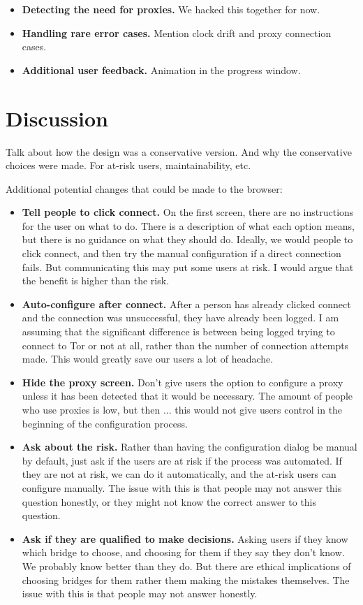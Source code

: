 \documentclass{template}
\begin{document}
\begin{itemize} \itemsep1pt \parskip0pt  
\item {\bfseries Detecting the need for proxies.} We hacked this together for now. 
\item {\bfseries Handling rare error cases.} Mention clock drift and proxy connection cases.
\item {\bfseries Additional user feedback.} Animation in the progress window. 
\end{itemize} 

\section{Discussion}
Talk about how the design was a conservative version. And why the conservative choices were made. For at-risk users, maintainability, etc.

Additional potential changes that could be made to the browser: 
\begin{itemize} \itemsep1pt \parskip0pt  
\item {\bfseries Tell people to click connect.} On the first screen, there are no instructions for the user on what to do. There is a description of what each option means, but there is no guidance on what they should do. Ideally, we would people to click connect, and then try the manual configuration if a direct connection fails. But communicating this may put some users at risk. I would argue that the benefit is higher than the risk. 
\item {\bfseries Auto-configure after connect.} After a person has already clicked connect and the connection was unsuccessful, they have already been logged. I am assuming that the significant difference is between being logged trying to connect to Tor or not at all, rather than the number of connection attempts made. This would greatly save our users a lot of headache. 
\item{\bfseries Hide the proxy screen.} Don't give users the option to configure a proxy unless it has been detected that it would be necessary. The amount of people who use proxies is low, but then ... this would not give users control in the beginning of the configuration process. 
\item{\bfseries Ask about the risk.} Rather than having the configuration dialog be manual by default, just ask if the users are at risk if the process was automated. If they are not at risk, we can do it automatically, and the at-risk users can configure manually. The issue with this is that people may not answer this question honestly, or they might not know the correct answer to this question. 
\item{\bfseries Ask if they are qualified to make decisions.} Asking users if they know which bridge to choose, and choosing for them if they say they don't know. We probably know better than they do. But there are ethical implications of choosing bridges for them rather them making the mistakes themselves. The issue with this is that people may not answer honestly. 
\end{itemize}
\end{document}
